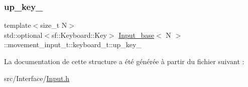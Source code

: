 \mbox{\label{struct_input__base_1_1movement__input__t_1_1keyboard__t_aa8136cb8a1daced841a7bf3349ae0efd}} 
\subsubsection{\texorpdfstring{up\+\_\+key\+\_\+}{up\_key\_}}
{\footnotesize\ttfamily template$<$size\+\_\+t N$>$ \\
std\+::optional$<$sf\+::\+Keyboard\+::\+Key$>$ \hyperlink{class_input__base}{Input\+\_\+base}$<$ N $>$\+::movement\+\_\+input\+\_\+t\+::keyboard\+\_\+t\+::up\+\_\+key\+\_\+}



La documentation de cette structure a été générée à partir du fichier suivant \+:\begin{DoxyCompactItemize}
\item 
src/\+Interface/\hyperlink{_input_8h}{Input.\+h}\end{DoxyCompactItemize}
